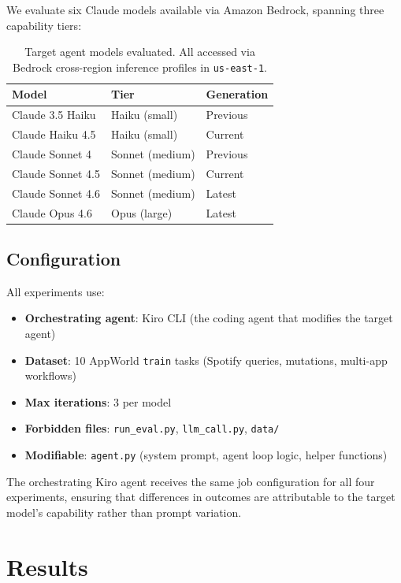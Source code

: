 \documentclass[11pt,a4paper]{article}
\begin{document}
We evaluate six Claude models available via Amazon Bedrock, spanning three capability tiers:

\begin{table}[h]
\centering
\begin{tabular}{lll}
\toprule
\textbf{Model} & \textbf{Tier} & \textbf{Generation} \\
\midrule
Claude 3.5 Haiku & Haiku (small) & Previous \\
Claude Haiku 4.5 & Haiku (small) & Current \\
Claude Sonnet 4 & Sonnet (medium) & Previous \\
Claude Sonnet 4.5 & Sonnet (medium) & Current \\
Claude Sonnet 4.6 & Sonnet (medium) & Latest \\
Claude Opus 4.6 & Opus (large) & Latest \\
\bottomrule
\end{tabular}
\caption{Target agent models evaluated. All accessed via Bedrock cross-region inference profiles in \texttt{us-east-1}.}
\label{tab:models}
\end{table}

\subsection{Configuration}

All experiments use:
\begin{itemize}
    \item \textbf{Orchestrating agent}: Kiro CLI (the coding agent that modifies the target agent)
    \item \textbf{Dataset}: 10 AppWorld \texttt{train} tasks (Spotify queries, mutations, multi-app workflows)
    \item \textbf{Max iterations}: 3 per model
    \item \textbf{Forbidden files}: \texttt{run\_eval.py}, \texttt{llm\_call.py}, \texttt{data/}
    \item \textbf{Modifiable}: \texttt{agent.py} (system prompt, agent loop logic, helper functions)
\end{itemize}

The orchestrating Kiro agent receives the same job configuration for all four experiments, ensuring that differences in outcomes are attributable to the target model's capability rather than prompt variation.

\section{Results}
\end{document}
